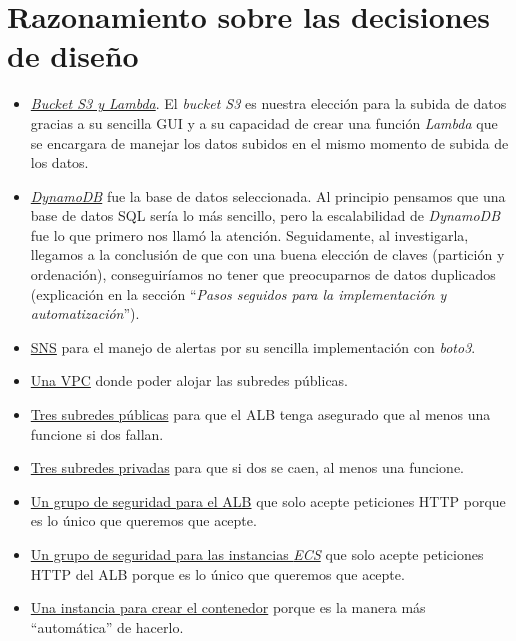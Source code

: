 \section{Razonamiento sobre las decisiones de diseño}

\begin{itemize}
    \item \underline{\textit{Bucket S3 y Lambda}}. El \textit{bucket S3} es nuestra elección para la subida de datos gracias a su sencilla GUI y a su capacidad de crear una función \textit{Lambda} que se encargara de manejar los datos subidos en el mismo momento de subida de los datos.

    \item \underline{\textit{DynamoDB}} fue la base de datos seleccionada. Al principio pensamos que una base de datos SQL sería lo más sencillo, pero la escalabilidad de \textit{DynamoDB} fue lo que primero nos llamó la atención. Seguidamente, al investigarla, llegamos a la conclusión de que con una buena elección de claves (partición y ordenación), conseguiríamos no tener que preocuparnos de datos duplicados (explicación en la sección ``\textit{Pasos seguidos para la implementación y automatización}'').

    \item \underline{SNS} para el manejo de alertas por su sencilla implementación con \textit{boto3}.

    \item \underline{Una VPC} donde poder alojar las subredes públicas.

    \item \underline{Tres subredes públicas} para que el ALB tenga asegurado que al menos una funcione si dos fallan.

    \item \underline{Tres subredes privadas} para que si dos se caen, al menos una funcione.

    \item \underline{Un grupo de seguridad para el ALB} que solo acepte peticiones HTTP porque es lo único que queremos que acepte.

    \item \underline{Un grupo de seguridad para las instancias \textit{ECS}} que solo acepte peticiones HTTP del ALB porque es lo único que queremos que acepte.

    \item \underline{Una instancia para crear el contenedor} porque es la manera más ``automática'' de hacerlo.


\end{itemize}
